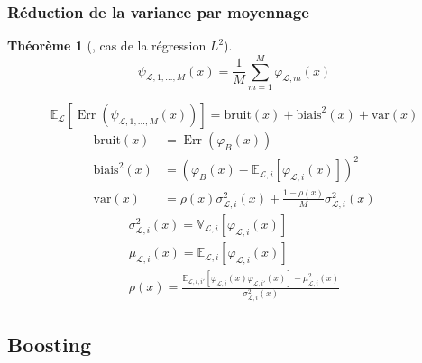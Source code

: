 \documentclass[dvipsnames,10pt]{beamer}
\theoremstyle{plain}
\newtheorem{theoreme}{Théorème}
\theoremstyle{definition}
\begin{document}
\begin{frame}
\frametitle{Réduction de la variance par moyennage}
\begin{theoreme}[\cite{Louppe2014}, cas de la régression $L^2$]
\begin{equation*}
    \psi_{\mathcal{L},1,\dotsc,M} (x) = \frac{1}{M} \sum_{m=1}^M \varphi_{\mathcal{L},m} (x)  
\end{equation*}
        
\begin{equation*}
    \mathbb{E}_{\mathcal{L}} \left[ \operatorname{Err}(\psi_{\mathcal{L},1,\dotsc,M} (x)) \right] = \mathrm{bruit}(x) + \mathrm{biais}^2 (x) + \mathrm{var} (x)
\end{equation*}
\begin{align*}
    \mathrm{bruit}(x) &= \operatorname{Err} ( \varphi_B (x) ) \\
    \mathrm{biais}^2 (x) &= \left( \varphi_B (x) - \mathbb{E}_{\mathcal{L},i} \left[ \varphi_{\mathcal{L},i} (x) \right] \right)^2 \\
    \mathrm{var} (x) &= \rho (x) \sigma^2_{\mathcal{L},i} (x) + \frac{1-\rho (x)}{M} \sigma^2_{\mathcal{L},i} (x) 
\end{align*}
\begin{gather*}
    \sigma^2_{\mathcal{L},i} (x) = \mathbb{V}_{\mathcal{L},i} [ \varphi_{\mathcal{L},i} (x)] \\
    \mu_{\mathcal{L},i} (x) = \mathbb{E}_{\mathcal{L},i} [ \varphi_{\mathcal{L},i} (x)] \\
    \rho (x) = \frac{\mathbb{E}_{\mathcal{L},i,i'} [ \varphi_{\mathcal{L},i} (x) \varphi_{\mathcal{L},i'} (x)] - \mu^2_{\mathcal{L},i} (x) }{\sigma^2_{\mathcal{L},i} (x)}
\end{gather*}
\end{theoreme}
\end{frame}

\subsection{Boosting}
\end{document}
